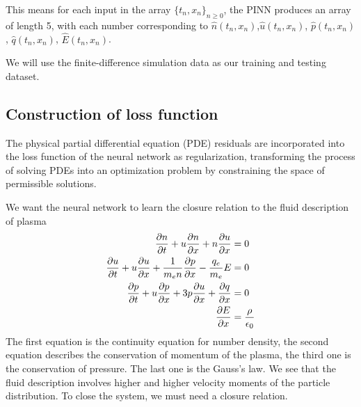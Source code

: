 \documentclass{article}
\begin{document}
    This means for each input in the array $\{t_n,x_n\}_{n\geq0}$, the PINN produces an array of length 5, with each number corresponding to $\hat{n}(t_n,x_n)$,$\hat{u}(t_n,x_n)$, $\hat{p}(t_n,x_n)$, $\hat{q}(t_n,x_n)$, $\hat{E}(t_n,x_n)$.

    We will use the finite-difference simulation data as our training and testing dataset. 

    \subsection{Construction of loss function}
    The physical partial differential equation (PDE) residuals are incorporated into the loss function of the neural network as regularization, transforming the process of solving PDEs into an optimization problem by constraining the space of permissible solutions.

    We want the neural network to learn the closure relation to the fluid description of plasma
    \begin{equation} \label{eq:fluid_equations}
        \begin{aligned}
            \pdv{n}{t} + u\pdv{n}{x} + n\pdv{u}{x} &= 0 \\
            \pdv{u}{t} + u\pdv{u}{x} + \frac{1}{m_en}\pdv{p}{x} - \frac{q_e}{m_e}E &= 0 \\
            \pdv{p}{t} + u\pdv{p}{x} + 3p\pdv{u}{x} + \pdv{q}{x} &= 0 \\
            \pdv{E}{x} &= \frac{\rho}{\epsilon_0}
        \end{aligned}
    \end{equation}
    The first equation is the continuity equation for number density, the second equation describes the conservation of momentum of the plasma, the third one is the conservation of pressure. The last one is the Gauss's law. We see that the fluid description involves higher and higher velocity moments of the particle distribution. To close the system, we must need a closure relation. 
\end{document}
